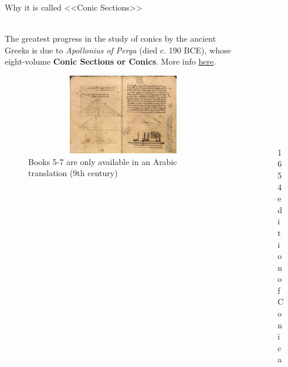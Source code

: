 \documentclass[aspectratio=169]{beamer}
\begin{document}
\begin{frame}[t]{Why it is called <<Conic Sections>>}
\framesubtitle{}
    \begin{columns}[T,onlytextwidth]
        \begin{column}{0.69\textwidth}
            The greatest progress in the study of conics by the ancient Greeks is due to \textit{Apollonius of Perga} (died c. 190 BCE), whose eight-volume \textbf{Conic Sections or Conics}. More info \href{https://en.wikipedia.org/wiki/Conic_section}{here}.
            \begin{figure}[H]
                \centering\includegraphics[height=3.5cm,width=1\textwidth,keepaspectratio]{conica_book.png}
                \caption*{Books 5-7 are only available in an Arabic translation (9th century)}
                \label{fig:conica_book.png}
            \end{figure}
        \end{column}
        \begin{column}{0.29\textwidth}
            \vspace{-0.5cm}
            \begin{figure}[H]
                \centering\includegraphics[height=5cm,width=1\textwidth,keepaspectratio]{apollonius_book.jpg}
                \caption*{1654 edition of Conica}
                \label{fig:apollonius_book.jpg}
            \end{figure}
        \end{column}
    \end{columns}
\end{frame}
\end{document}
